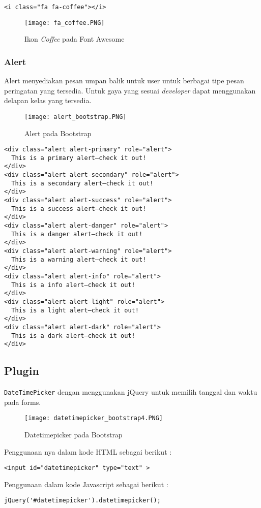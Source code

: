 \begin{lstlisting}[frame=single]
<i class="fa fa-coffee"></i>
\end{lstlisting}

\begin{figure} [H]
	\centering  
	\texttt{[image: fa\_coffee.PNG]}  
	\caption{Ikon \textit{Coffee} pada Font Awesome} 
\end{figure}
\subsubsection{Alert}
Alert menyediakan pesan umpan balik untuk user untuk berbagai tipe pesan peringatan yang tersedia. Untuk gaya yang sesuai \textit{developer} dapat menggunakan delapan kelas yang tersedia.
\begin{figure} [H]
	\centering  
	\texttt{[image: alert\_bootstrap.PNG]}  
	\caption{Alert pada Bootstrap} 
\end{figure}
\begin{lstlisting}[frame=single] 
<div class="alert alert-primary" role="alert">
  This is a primary alert—check it out!
</div>
<div class="alert alert-secondary" role="alert">
  This is a secondary alert—check it out!
</div>
<div class="alert alert-success" role="alert">
  This is a success alert—check it out!
</div>
<div class="alert alert-danger" role="alert">
  This is a danger alert—check it out!
</div>
<div class="alert alert-warning" role="alert">
  This is a warning alert—check it out!
</div>
<div class="alert alert-info" role="alert">
  This is a info alert—check it out!
</div>
<div class="alert alert-light" role="alert">
  This is a light alert—check it out!
</div>
<div class="alert alert-dark" role="alert">
  This is a dark alert—check it out!
</div>
\end{lstlisting}

\subsection{Plugin}
\texttt{DateTimePicker} dengan menggunakan jQuery untuk memilih tanggal dan waktu pada forms.
\begin{figure} [H]
	\centering  
	\texttt{[image: datetimepicker\_bootstrap4.PNG]}  
	\caption{Datetimepicker pada Bootstrap} 
\end{figure}
\noindent Penggunaan nya dalam kode HTML sebagai berikut :
\begin{lstlisting}[frame=single] 
<input id="datetimepicker" type="text" >
\end{lstlisting}

\noindent Penggunaan dalam kode Javascript sebagai berikut :
\begin{lstlisting}[frame=single] 
jQuery('#datetimepicker').datetimepicker();
\end{lstlisting}

 

 
